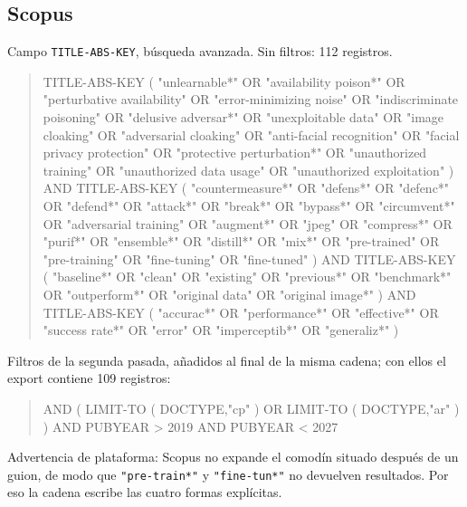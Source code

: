 \documentclass[pdflatex,sn-mathphys-num]{sn-jnl}
\theoremstyle{thmstyleone}
\theoremstyle{thmstyletwo}
\theoremstyle{thmstylethree}
\begin{document}
\begin{appendices}
\subsection{Scopus}
Campo \texttt{TITLE-ABS-KEY}, búsqueda avanzada. Sin filtros: 112 registros.
\begin{quote}\footnotesize\ttfamily\raggedright
TITLE-ABS-KEY ( "unlearnable*" OR \allowbreak "availability poison*" OR \allowbreak "perturbative availability" OR \allowbreak "error-minimizing noise" OR \allowbreak "indiscriminate poisoning" OR \allowbreak "delusive adversar*" OR \allowbreak "unexploitable data" OR \allowbreak "image cloaking" OR \allowbreak "adversarial cloaking" OR \allowbreak "anti-facial recognition" OR \allowbreak "facial privacy protection" OR \allowbreak "protective perturbation*" OR \allowbreak "unauthorized training" OR \allowbreak "unauthorized data usage" OR \allowbreak "unauthorized exploitation" ) AND \allowbreak TITLE-ABS-KEY ( "countermeasure*" OR \allowbreak "defens*" OR \allowbreak "defenc*" OR \allowbreak "defend*" OR \allowbreak "attack*" OR \allowbreak "break*" OR \allowbreak "bypass*" OR \allowbreak "circumvent*" OR \allowbreak "adversarial training" OR \allowbreak "augment*" OR \allowbreak "jpeg" OR \allowbreak "compress*" OR \allowbreak "purif*" OR \allowbreak "ensemble*" OR \allowbreak "distill*" OR \allowbreak "mix*" OR \allowbreak "pre-trained" OR \allowbreak "pre-training" OR \allowbreak "fine-tuning" OR \allowbreak "fine-tuned" ) AND \allowbreak TITLE-ABS-KEY ( "baseline*" OR \allowbreak "clean" OR \allowbreak "existing" OR \allowbreak "previous*" OR \allowbreak "benchmark*" OR \allowbreak "outperform*" OR \allowbreak "original data" OR \allowbreak "original image*" ) AND \allowbreak TITLE-ABS-KEY ( "accurac*" OR \allowbreak "performance*" OR \allowbreak "effective*" OR \allowbreak "success rate*" OR \allowbreak "error" OR \allowbreak "imperceptib*" OR \allowbreak "generaliz*" )
\end{quote}
Filtros de la segunda pasada, añadidos al final de la misma cadena; con ellos el export contiene 109 registros:
\begin{quote}\footnotesize\ttfamily\raggedright
AND ( LIMIT-TO ( DOCTYPE,"cp" ) OR \allowbreak LIMIT-TO ( DOCTYPE,"ar" ) ) AND \allowbreak PUBYEAR > 2019 AND \allowbreak PUBYEAR < 2027
\end{quote}
Advertencia de plataforma: Scopus no expande el comodín situado después de un guion, de modo que \texttt{"pre-train*"} y \texttt{"fine-tun*"} no devuelven resultados. Por eso la cadena escribe las cuatro formas explícitas.


\end{appendices}
\end{document}
